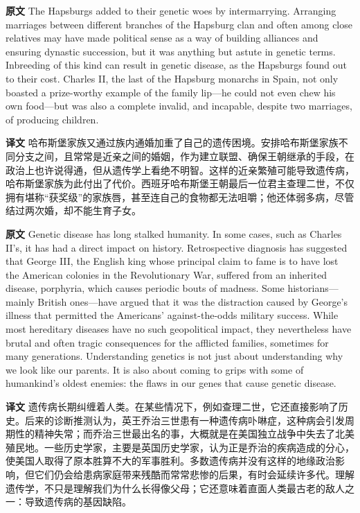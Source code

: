 \documentclass[UTF8,zihao=-4]{ctexart}
\newcommand{\BodyFont}{\fontsize{10.5pt}{15.5pt}\selectfont}
\renewenvironment{quote}{\par\noindent\begingroup\BodyFont}{\par\endgroup}
\begin{document}
\begin{quote}
\noindent\textbf{原文} The Hapsburgs added to their genetic woes by intermarrying. Arranging marriages between different branches of the Hapsburg clan and often among close relatives may have made political sense as a way of building alliances and ensuring dynastic succession, but it was anything but astute in genetic terms. Inbreeding of this kind can result in genetic disease, as the Hapsburgs found out to their cost. Charles II, the last of the Hapsburg monarchs in Spain, not only boasted a prize-worthy example of the family lip---he could not even chew his own food---but was also a complete invalid, and incapable, despite two marriages, of producing children.

\smallskip
\noindent\textbf{译文} 哈布斯堡家族又通过族内通婚加重了自己的遗传困境。安排哈布斯堡家族不同分支之间，且常常是近亲之间的婚姻，作为建立联盟、确保王朝继承的手段，在政治上也许说得通，但从遗传学上看绝不明智。这样的近亲繁殖可能导致遗传病，哈布斯堡家族为此付出了代价。西班牙哈布斯堡王朝最后一位君主查理二世，不仅拥有堪称“获奖级”的家族唇，甚至连自己的食物都无法咀嚼；他还体弱多病，尽管结过两次婚，却不能生育子女。
\end{quote}

\begin{quote}
\noindent\textbf{原文} Genetic disease has long stalked humanity. In some cases, such as Charles II's, it has had a direct impact on history. Retrospective diagnosis has suggested that George III, the English king whose principal claim to fame is to have lost the American colonies in the Revolutionary War, suffered from an inherited disease, porphyria, which causes periodic bouts of madness. Some historians---mainly British ones---have argued that it was the distraction caused by George's illness that permitted the Americans' against-the-odds military success. While most hereditary diseases have no such geopolitical impact, they nevertheless have brutal and often tragic consequences for the afflicted families, sometimes for many generations. Understanding genetics is not just about understanding why we look like our parents. It is also about coming to grips with some of humankind's oldest enemies: the flaws in our genes that cause genetic disease.

\smallskip
\noindent\textbf{译文} 遗传病长期纠缠着人类。在某些情况下，例如查理二世，它还直接影响了历史。后来的诊断推测认为，英王乔治三世患有一种遗传病卟啉症，这种病会引发周期性的精神失常；而乔治三世最出名的事，大概就是在美国独立战争中失去了北美殖民地。一些历史学家，主要是英国历史学家，认为正是乔治的疾病造成的分心，使美国人取得了原本胜算不大的军事胜利。多数遗传病并没有这样的地缘政治影响，但它们仍会给患病家庭带来残酷而常常悲惨的后果，有时会延续许多代。理解遗传学，不只是理解我们为什么长得像父母；它还意味着直面人类最古老的敌人之一：导致遗传病的基因缺陷。
\end{quote}
\end{document}
